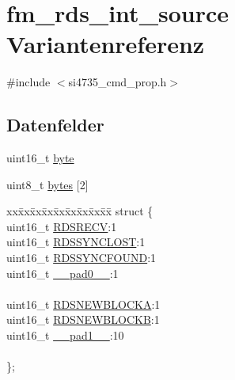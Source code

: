 \hypertarget{unionfm__rds__int__source}{}\section{fm\+\_\+rds\+\_\+int\+\_\+source Variantenreferenz}
\label{unionfm__rds__int__source}


{\ttfamily \#include $<$si4735\+\_\+cmd\+\_\+prop.\+h$>$}

\subsection*{Datenfelder}
\begin{DoxyCompactItemize}
\item 
uint16\+\_\+t \hyperlink{unionfm__rds__int__source_ab0549c1b5ea980a02e7eab77e21fea49}{byte}
\item 
uint8\+\_\+t \hyperlink{unionfm__rds__int__source_a46e4c05d20a047ec169f60d3167e912e}{bytes} \mbox{[}2\mbox{]}
\item 
\begin{tabbing}
xx\=xx\=xx\=xx\=xx\=xx\=xx\=xx\=xx\=\kill
struct \{\\
\>uint16\_t \hyperlink{unionfm__rds__int__source_af44cb84a104f9c29f31b0ac4bd89a601}{RDSRECV}:1\\
\>uint16\_t \hyperlink{unionfm__rds__int__source_aeca7437db524c8748f4ccd800033970d}{RDSSYNCLOST}:1\\
\>uint16\_t \hyperlink{unionfm__rds__int__source_a2cc7666ab88379a96c9b09cc3dec22cb}{RDSSYNCFOUND}:1\\
\>uint16\_t \hyperlink{unionfm__rds__int__source_a77132c2c26a75f5b8751b235cda23828}{\_\_pad0\_\_}:1\\
\>\\
\>uint16\_t \hyperlink{unionfm__rds__int__source_ac17dff4f668dfb0ff56bc115adf2190a}{RDSNEWBLOCKA}:1\\
\>uint16\_t \hyperlink{unionfm__rds__int__source_ae17ab7ac1a00946b1d73b05899a30202}{RDSNEWBLOCKB}:1\\
\>uint16\_t \hyperlink{unionfm__rds__int__source_ab72e3a1f2f7db8695c60c658f5a0f11a}{\_\_pad1\_\_}:10\\
\>\\
\}; \\

\end{tabbing}\end{DoxyCompactItemize}


